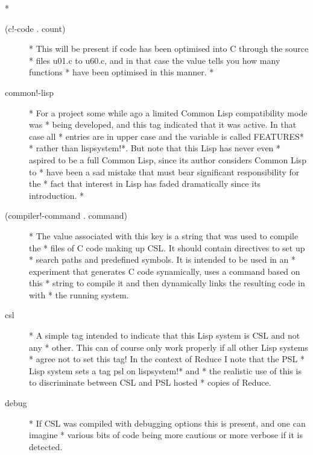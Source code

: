 \documentclass[a4paper,11pt]{article}
\begin{document}
  * \begin{description}

\item[{\ttfamily (c!-code . count)}] 
      * This will be present if code has been optimised into C through the source
      * files u01.c to u60.c, and in that case the value tells you how many functions
      * have been optimised in this manner.
      *

\item[{\ttfamily  common!-lisp}] 
      * For a project some while ago a limited Common Lisp compatibility mode was
      * being developed, and this tag indicated that it was active. In that case all
      * entries are in upper case and the variable is called {\ttfamily *FEATURES*}
      * rather than {\ttfamily lispsystem!*}. But note that this Lisp has never even
      * aspired to be a full Common Lisp, since its author considers Common Lisp to
      * have been a sad mistake that must bear significant responsibility for the
      * fact that interest in Lisp has faded dramatically since its introduction.
      *

\item[{\ttfamily (compiler!-command . command)}] 
      * The value associated with this key is a string that was used to compile the
      * files of C code making up CSL. It should contain directives to set up
      * search paths and predefined symbols. It is intended to be used in an
      * experiment that generates C code synamically, uses a command based on this
      * string to compile it and then dynamically links the resulting code in with
      * the running system.

\item[{\ttfamily csl}] 
      * A simple tag intended to indicate that this Lisp system is CSL and not any
      * other. This can of course only work properly if all other Lisp systems
      * agree not to set this tag! In the context of Reduce I note that the PSL
      * Lisp system sets a tag {\ttfamily psl} on {\ttfamily lispsystem!*} and
      * the realistic use of this is to discriminate between CSL and PSL hosted
      * copies of Reduce.

\item[{\ttfamily debug}] 
      * If CSL was compiled with debugging options this is present, and one can imagine
      * various bits of code being more cautious or more verbose if it is detected.


\end{description}
\end{document}
